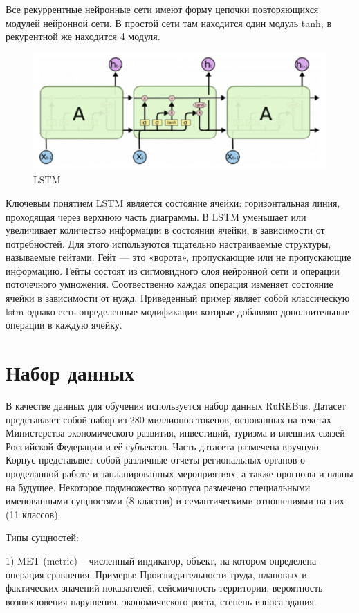 \documentclass{article}
\begin{document}
Все рекуррентные нейронные сети имеют форму цепочки повторяющихся модулей нейронной сети. В простой сети там находится один модуль tanh, в рекурентной же находится 4 модуля.

\begin{figure}[!tbh]
    \centering
    \includegraphics[width=0.9\linewidth]{3.png}
    \caption{LSTM}
    \label{fig:circle}
\end{figure}

Ключевым понятием LSTM является состояние ячейки: горизонтальная линия, проходящая через верхнюю часть диаграммы. В LSTM уменьшает или увеличивает количество информации в состоянии ячейки, в зависимости от потребностей. Для этого используются тщательно настраиваемые структуры, называемые гейтами. Гейт — это «ворота», пропускающие или не пропускающие информацию. Гейты состоят из сигмовидного слоя нейронной сети и операции поточечного умножения. Соотвественно каждая операция изменяет состояние ячейки в зависимости от нужд. Приведенный пример являет собой классическую lstm однако есть определенные модификации которые добавляю дополнительные операции в каждую ячейку.

\section{Набор данных}
В качестве данных для обучения используется набор данных RuREBus. Датасет представляет собой набор из 280 миллионов токенов, основанных на текстах Министерства экономического развития, инвестиций, туризма и внешних связей Российской Федерации и её субъектов. Часть датасета размечена вручную. Корпус представляет собой различные отчеты региональных органов о проделанной работе и запланированных мероприятиях, а также прогнозы и планы на будущее. Некоторое подмножество корпуса размечено специальными именованными сущностями (8 классов) и семантическими отношениями на них (11 классов).

Типы сущностей: 

1) MET (metric) – численный индикатор, объект, на котором определена операция сравнения. 
Примеры: Производительности труда, плановых и фактических значений показателей, сейсмичность территории, вероятность возникновения нарушения, экономического роста, степень износа здания.
\end{document}

